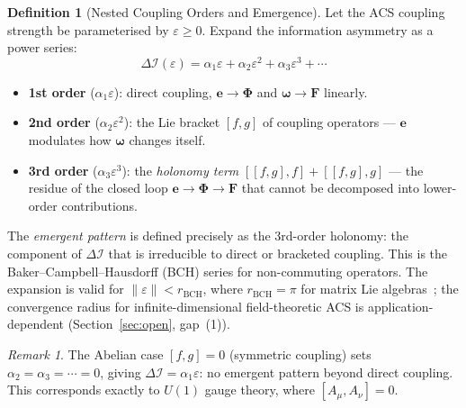 \documentclass[11pt,a4paper]{article}
\theoremstyle{plain}
\theoremstyle{definition}
\newtheorem{definition}[theorem]{Definition}
\theoremstyle{remark}
\newtheorem{remark}[theorem]{Remark}
\newcommand{\DI}{\Delta\mathcal{I}}
\newcommand{\eps}{\varepsilon}
\newcommand{\FormF}{\mathbf{F}}
\newcommand{\FuncF}{\boldsymbol{\Phi}}
\renewcommand{\Form}{\mathbf{e}}
\providecommand{\Func}{\boldsymbol{\omega}}
\begin{document}
\begin{definition}[Nested Coupling Orders and Emergence]\label{def:nested}
Let the ACS coupling strength be parameterised by $\eps \geq 0$.
Expand the information asymmetry as a power series:
\begin{equation}
  \DI(\eps) = \alpha_1 \eps + \alpha_2 \eps^2 + \alpha_3 \eps^3 + \cdots
\end{equation}
\begin{itemize}[noitemsep]
  \item \textbf{1st order} ($\alpha_1 \eps$): direct coupling, $\Form \to \FuncF$ and $\Func \to \FormF$ linearly.
  \item \textbf{2nd order} ($\alpha_2 \eps^2$): the Lie bracket $[f,g]$ of coupling 
    operators --- $\Form$ modulates how $\Func$ changes itself.
  \item \textbf{3rd order} ($\alpha_3 \eps^3$): the \emph{holonomy term} 
    $[[f,g],f] + [[f,g],g]$ --- the residue of the closed loop 
    $\Form \to \FuncF \to \FormF$ that cannot be decomposed into lower-order contributions.
\end{itemize}
The \emph{emergent pattern} is defined precisely as the 3rd-order holonomy: 
the component of $\DI$ that is irreducible to direct or bracketed coupling.
This is the Baker--Campbell--Hausdorff (BCH) series for non-commuting operators.
The expansion is valid for $\|\eps\| < r_{\mathrm{BCH}}$, where
$r_{\mathrm{BCH}} = \pi$ for matrix Lie algebras~\cite{Hall2015};
the convergence radius for infinite-dimensional field-theoretic ACS
is application-dependent (Section~\ref{sec:open}, gap~(1)).
\end{definition}

\begin{remark}
The Abelian case $[f,g] = 0$ (symmetric coupling) sets $\alpha_2 = \alpha_3 = \cdots = 0$, 
giving $\DI = \alpha_1 \eps$: no emergent pattern beyond direct coupling.
This corresponds exactly to $U(1)$ gauge theory, where $[A_\mu, A_\nu] = 0$.
\end{remark}
\end{document}
